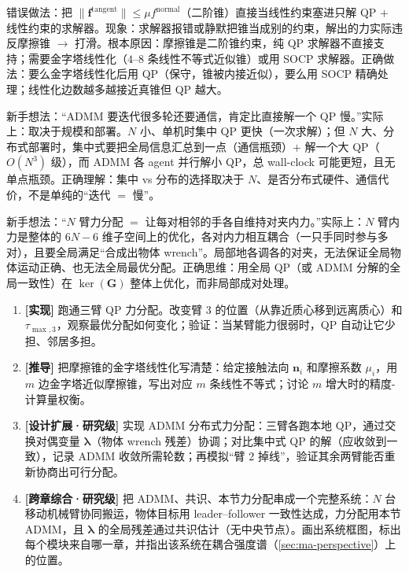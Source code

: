 \begin{pitfall}
错误做法：把 $\|\mathbf{f}^{\text{tangent}}\|\le\mu f^{\text{normal}}$（二阶锥）直接当线性约束塞进只解 QP $+$ 线性约束的求解器。现象：求解器报错或静默把锥当成别的约束，解出的力实际违反摩擦锥 $\to$ 打滑。根本原因：摩擦锥是二阶锥约束，纯 QP 求解器不直接支持；需要金字塔线性化（$4$--$8$ 条线性不等式近似锥）或用 SOCP 求解器。正确做法：要么金字塔线性化后用 QP（保守，锥被内接近似），要么用 SOCP 精确处理；线性化边数越多越接近真锥但 QP 越大。
\end{pitfall}

\begin{pitfall}
新手想法：“ADMM 要迭代很多轮还要通信，肯定比直接解一个 QP 慢。”实际上：取决于规模和部署。$N$ 小、单机时集中 QP 更快（一次求解）；但 $N$ 大、分布式部署时，集中式要把全局信息汇总到一点（通信瓶颈）$+$ 解一个大 QP（$O(N^3)$ 级），而 ADMM 各 agent 并行解小 QP，总 wall-clock 可能更短，且无单点瓶颈。正确理解：集中 vs 分布的选择取决于 $N$、是否分布式硬件、通信代价，不是单纯的“迭代 $=$ 慢”。
\end{pitfall}

\begin{pitfall}
新手想法：“$N$ 臂力分配 $=$ 让每对相邻的手各自维持对夹内力。”实际上：$N$ 臂内力是整体的 $6N-6$ 维子空间上的优化，各对内力相互耦合（一只手同时参与多对），且要全局满足“合成出物体 wrench”。局部地各调各的对夹，无法保证全局物体运动正确、也无法全局最优分配。正确思维：用全局 QP（或 ADMM 分解的全局一致性）在 $\ker(\mathbf{G})$ 整体上优化，而非局部成对处理。
\end{pitfall}

\begin{exercise}
\begin{enumerate}
  \item \textbf{[实现]} 跑通三臂 QP 力分配。改变臂 3 的位置（从靠近质心移到远离质心）和 $\tau_{\max,3}$，观察最优分配如何变化；验证：当某臂能力很弱时，QP 自动让它少担、邻居多担。
  \item \textbf{[推导]} 把摩擦锥的金字塔线性化写清楚：给定接触法向 $\mathbf{n}_i$ 和摩擦系数 $\mu_i$，用 $m$ 边金字塔近似摩擦锥，写出对应 $m$ 条线性不等式；讨论 $m$ 增大时的精度-计算量权衡。
  \item \textbf{[设计扩展·研究级]} 实现 ADMM 分布式力分配：三臂各跑本地 QP，通过交换对偶变量 $\boldsymbol{\lambda}$（物体 wrench 残差）协调；对比集中式 QP 的解（应收敛到一致），记录 ADMM 收敛所需轮数；再模拟“臂 2 掉线”，验证其余两臂能否重新协商出可行分配。
  \item \textbf{[跨章综合·研究级]} 把 ADMM、共识、本节力分配串成一个完整系统：$N$ 台移动机械臂协同搬运，物体目标用 leader--follower 一致性达成，力分配用本节 ADMM，且 $\boldsymbol{\lambda}$ 的全局残差通过共识估计（无中央节点）。画出系统框图，标出每个模块来自哪一章，并指出该系统在耦合强度谱（\cref{sec:ma-perspective}）上的位置。
\end{enumerate}
\end{exercise}


